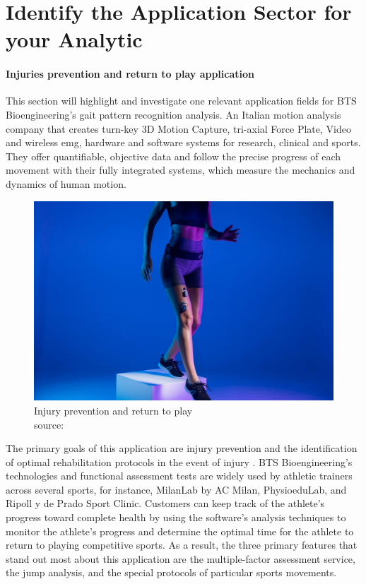 \chapter{Identify the Application Sector for your Analytic}

\subsubsection{Injuries prevention and return to play application}

This section will highlight and investigate one relevant application fields for BTS Bioengineering's gait pattern recognition analysis. An Italian motion analysis company that creates turn-key 3D Motion Capture, tri-axial Force Plate, Video and wireless \ac{emg}, hardware and software systems for research, clinical and sports. They offer quantifiable, objective data and follow the precise progress of each movement with their fully integrated systems, which measure the mechanics and dynamics of human motion.

\begin{figure}[h]
    \centering
    \includegraphics[scale=0.125]{Images/Injury prevention and return to play.jpeg}
    \captionsetup{justification=centering}
    \caption{Injury prevention and return to play \\ source: \cite{BTS_Injury_prevention2022}}
    \label{fig:Injury prevention and return to play}
\end{figure}


The primary goals of this application are injury prevention and the identification of optimal rehabilitation protocols in the event of injury \cite{BTS_Injury_prevention2022}. BTS Bioengineering's technologies and functional assessment tests are widely used by athletic trainers across several sports, for instance, MilanLab by AC Milan, PhysioeduLab, and Ripoll y de Prado Sport Clinic. Customers can keep track of the athlete's progress toward complete health by using the software's analysis techniques to monitor the athlete's progress and determine the optimal time for the athlete to return to playing competitive sports. As a result, the three primary features that stand out most about this application are the multiple-factor assessment service, the jump analysis, and the special protocols of particular sports movements.
